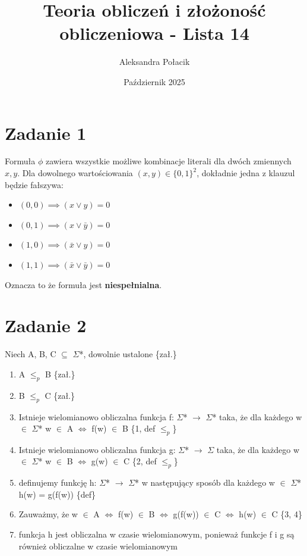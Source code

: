 \documentclass{article}
\title{Teoria obliczeń i złożoność obliczeniowa - Lista 14}
\author{Aleksandra Połacik}
\date{Październik 2025}
\begin{document}
\maketitle

\section{Zadanie 1}
Formuła $\phi$ zawiera wszystkie możliwe kombinacje literali dla dwóch zmiennych $x, y$.
Dla dowolnego wartościowania $(x, y) \in \{0, 1\}^2$, dokładnie jedna z klauzul będzie fałszywa:
\begin{itemize}
    \item $(0,0) \implies (x \lor y) = 0$
    \item $(0,1) \implies (x \lor \bar{y}) = 0$
    \item $(1,0) \implies (\bar{x} \lor y) = 0$
    \item $(1,1) \implies (\bar{x} \lor \bar{y}) = 0$
\end{itemize}
Oznacza to że formuła jest \textbf{niespełnialna}.


\section{Zadanie 2}
Niech A, B, C $\subseteq$ $\Sigma$*, dowolnie ustalone \{zał.\}\\
\begin{enumerate}
    \item A $\leq_p$ B \{zał.\}
    \item B $\leq_p$ C \{zał.\}
    \item Istnieje wielomianowo obliczalna funkcja f: $\Sigma$* $\longrightarrow$ $\Sigma$* taka, że dla każdego w $\in$ $\Sigma$* w $\in$ A $\iff$ f(w) $\in$ B \{1, def $\leq_p$\}
    \item Istnieje wielomianowo obliczalna   funkcja g: $\Sigma$* $\longrightarrow$ $\Sigma$ taka, że dla każdego w $\in$ $\Sigma$* w $\in$ B $\iff$ g(w) $\in$ C \{2, def $\leq_p$\}
    \item definujemy funkcję h: $\Sigma$* $\longrightarrow$ $\Sigma$* w następujący sposób dla każdego w $\in$ $\Sigma$* h(w) = g(f(w)) \{def\}
    \item Zauważmy, że w $\in$ A $\iff$ f(w) $\in$ B $\iff$ g(f(w)) $\in$ C $\iff$ h(w) $\in$ C \{3, 4\}
    \item funkcja h jest obliczalna w czasie wielomianowym, ponieważ funkcje f i g są również obliczalne w czasie wielomianowym
\end{enumerate}
\end{document}
